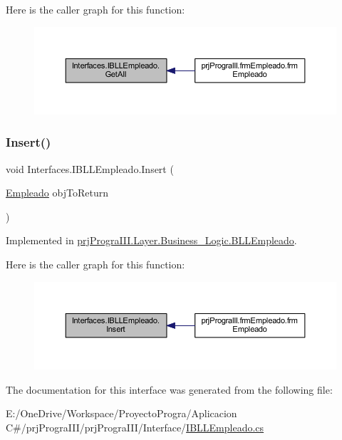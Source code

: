 Here is the caller graph for this function\+:
\nopagebreak
\begin{figure}[H]
\begin{center}
\leavevmode
\includegraphics[width=350pt]{interface_interfaces_1_1_i_b_l_l_empleado_af28eb97c31bd09546d3ececa39800ae4_icgraph}
\end{center}
\end{figure}
\hypertarget{interface_interfaces_1_1_i_b_l_l_empleado_ae42950dd884578920123132ef21224b1}{}\label{interface_interfaces_1_1_i_b_l_l_empleado_ae42950dd884578920123132ef21224b1} 
\subsubsection{\texorpdfstring{Insert()}{Insert()}}
{\footnotesize\ttfamily void Interfaces.\+I\+B\+L\+L\+Empleado.\+Insert (\begin{DoxyParamCaption}\item[{\hyperlink{classprj_progra_i_i_i_1_1_layer_1_1_entities_1_1_empleado}{Empleado}}]{obj\+To\+Return }\end{DoxyParamCaption})}



Implemented in \hyperlink{classprj_progra_i_i_i_1_1_layer_1_1_business___logic_1_1_b_l_l_empleado_a80ef323c864712e491fa040752455d0e}{prj\+Progra\+I\+I\+I.\+Layer.\+Business\+\_\+\+Logic.\+B\+L\+L\+Empleado}.

Here is the caller graph for this function\+:
\nopagebreak
\begin{figure}[H]
\begin{center}
\leavevmode
\includegraphics[width=350pt]{interface_interfaces_1_1_i_b_l_l_empleado_ae42950dd884578920123132ef21224b1_icgraph}
\end{center}
\end{figure}


The documentation for this interface was generated from the following file\+:\begin{DoxyCompactItemize}
\item 
E\+:/\+One\+Drive/\+Workspace/\+Proyecto\+Progra/\+Aplicacion C\#/prj\+Progra\+I\+I\+I/prj\+Progra\+I\+I\+I/\+Interface/\hyperlink{_i_b_l_l_empleado_8cs}{I\+B\+L\+L\+Empleado.\+cs}\end{DoxyCompactItemize}
